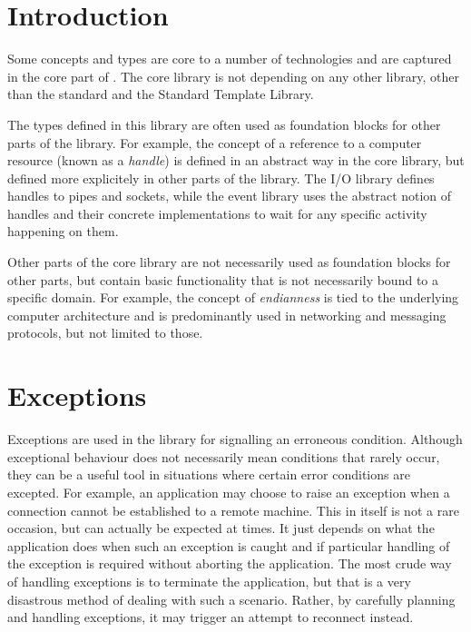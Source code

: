 \documentclass[10pt,a4paper,openany]{mudbook}
\begin{document}
\chapter{Introduction}
\label{chp:core-introduction}

Some concepts and types are core to a number of technologies and are captured
in the core part of \MUDLib. The core library is not depending on any other
library, other than the standard \Cpp and the Standard Template Library.

The types defined in this library are often used as foundation blocks for
other parts of the \MUDLib library. For example, the concept of a reference
to a computer resource (known as a \textit{handle}) is defined in an abstract
way in the core library, but defined more explicitely in other parts of the
library. The I/O library defines handles to pipes and sockets, while the
event library uses the abstract notion of handles and their concrete
implementations to wait for any specific activity happening on them.

Other parts of the core library are not necessarily used as foundation blocks
for other parts, but contain basic functionality that is not necessarily
bound to a specific domain. For example, the concept of \textit{endianness}
is tied to the underlying computer architecture and is predominantly used in
networking and messaging protocols, but not limited to those.


\chapter{Exceptions}
\label{chp:core-exceptions}

Exceptions are used in the \MUDLib library for signalling an erroneous
condition. Although exceptional behaviour does not necessarily mean conditions
that rarely occur, they can be a useful tool in situations where certain
error conditions are excepted. For example, an application may choose to raise
an exception when a connection cannot be established to a remote machine.
This in itself is not a rare occasion, but can actually be expected at times.
It just depends on what the application does when such an exception is caught
and if particular handling of the exception is required without aborting the
application. The most crude way of handling exceptions is to terminate the
application, but that is a very disastrous method of dealing with such a
scenario. Rather, by carefully planning and handling exceptions, it may trigger
an attempt to reconnect instead. 
\end{document}
